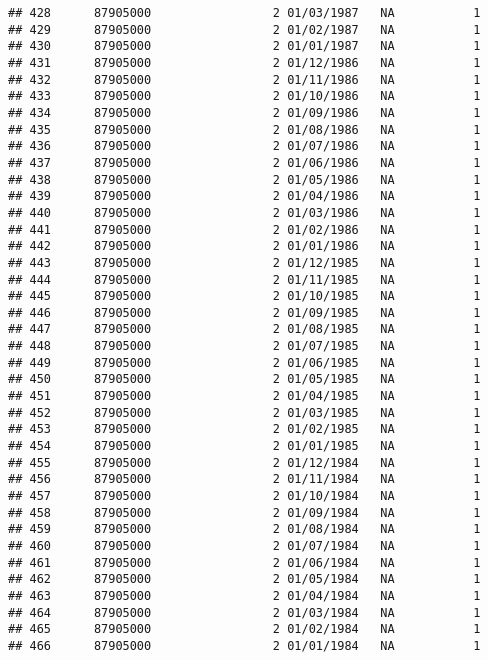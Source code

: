 \documentclass[
]{article}
\begin{document}
\begin{verbatim}
## 428      87905000                 2 01/03/1987   NA           1
## 429      87905000                 2 01/02/1987   NA           1
## 430      87905000                 2 01/01/1987   NA           1
## 431      87905000                 2 01/12/1986   NA           1
## 432      87905000                 2 01/11/1986   NA           1
## 433      87905000                 2 01/10/1986   NA           1
## 434      87905000                 2 01/09/1986   NA           1
## 435      87905000                 2 01/08/1986   NA           1
## 436      87905000                 2 01/07/1986   NA           1
## 437      87905000                 2 01/06/1986   NA           1
## 438      87905000                 2 01/05/1986   NA           1
## 439      87905000                 2 01/04/1986   NA           1
## 440      87905000                 2 01/03/1986   NA           1
## 441      87905000                 2 01/02/1986   NA           1
## 442      87905000                 2 01/01/1986   NA           1
## 443      87905000                 2 01/12/1985   NA           1
## 444      87905000                 2 01/11/1985   NA           1
## 445      87905000                 2 01/10/1985   NA           1
## 446      87905000                 2 01/09/1985   NA           1
## 447      87905000                 2 01/08/1985   NA           1
## 448      87905000                 2 01/07/1985   NA           1
## 449      87905000                 2 01/06/1985   NA           1
## 450      87905000                 2 01/05/1985   NA           1
## 451      87905000                 2 01/04/1985   NA           1
## 452      87905000                 2 01/03/1985   NA           1
## 453      87905000                 2 01/02/1985   NA           1
## 454      87905000                 2 01/01/1985   NA           1
## 455      87905000                 2 01/12/1984   NA           1
## 456      87905000                 2 01/11/1984   NA           1
## 457      87905000                 2 01/10/1984   NA           1
## 458      87905000                 2 01/09/1984   NA           1
## 459      87905000                 2 01/08/1984   NA           1
## 460      87905000                 2 01/07/1984   NA           1
## 461      87905000                 2 01/06/1984   NA           1
## 462      87905000                 2 01/05/1984   NA           1
## 463      87905000                 2 01/04/1984   NA           1
## 464      87905000                 2 01/03/1984   NA           1
## 465      87905000                 2 01/02/1984   NA           1
## 466      87905000                 2 01/01/1984   NA           1

\end{verbatim}
\end{document}
